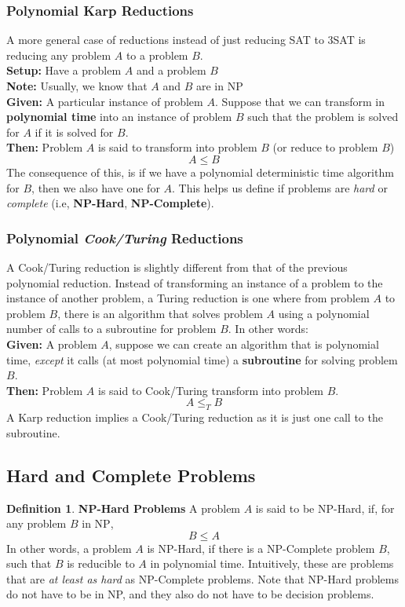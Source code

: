 \documentclass{article}
\theoremstyle{definition}
\newtheorem{definition}{Definition}[section]
\newcommand{\n}[0]{\\[\baselineskip]}
\begin{document}
\subsubsection{Polynomial Karp Reductions}
A more general case of reductions instead of just reducing SAT to 3SAT is reducing any problem $A$ to a problem $B$. 
\n
\textbf{Setup:} Have a problem $A$ and a problem $B$ \\
\textbf{Note:} Usually, we know that $A$ and $B$ are in \textsc{NP} \\
\textbf{Given:} A particular instance of problem $A$. Suppose that we can transform in \textbf{polynomial time} into an instance of problem $B$ such that the problem is solved for $A$ if it is solved for $B$. \\
\textbf{Then:} Problem $A$ is said to transform into problem $B$ (or reduce to problem $B$)
\begin{equation}
A \leq B
\end{equation}
The consequence of this, is if we have a polynomial deterministic time algorithm for $B$, then we also have one for $A$. This helps us define if problems are \textit{hard} or \textit{complete} (i.e, \textbf{NP-Hard}, \textbf{NP-Complete}).
\subsubsection{Polynomial \textit{Cook/Turing} Reductions}
A Cook/Turing reduction is slightly different from that of the previous polynomial reduction. Instead of transforming an instance of a problem to the instance of another problem, a Turing reduction is one where from problem $A$ to problem $B$, there is an algorithm that solves problem $A$ using a polynomial number of calls to a subroutine for problem $B$. In other words:
\n
\textbf{Given:} A problem $A$, suppose we can create an algorithm that is polynomial time, \textit{except} it calls (at most polynomial time) a \textbf{subroutine} for solving problem $B$. \\
\textbf{Then:} Problem $A$ is said to Cook/Turing transform into problem $B$.
\begin{equation}
A \leq_{T} B
\end{equation}
A Karp reduction implies a Cook/Turing reduction as it is just one call to the subroutine. 

\subsection{Hard and Complete Problems}
\begin{definition}{\textbf{NP-Hard Problems}}
A problem $A$ is said to be NP-Hard, if, for any problem $B$ in \textsc{NP}, 
\begin{equation}
B \leq A
\end{equation}
In other words, a problem $A$ is NP-Hard, if there is a NP-Complete problem $B$, such that $B$ is reducible to $A$ in polynomial time. Intuitively, these are problems that are \textit{at least as hard} as NP-Complete problems. Note that NP-Hard problems do not have to be in NP, and they also do not have to be decision problems. 
\end{definition}
\end{document}
